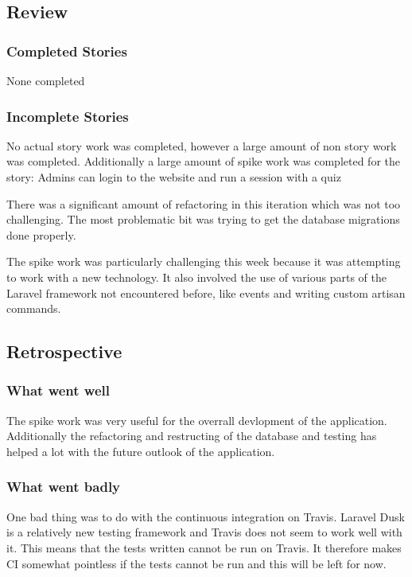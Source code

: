 \subsection{Review}
\subsubsection{Completed Stories}
None completed
\subsubsection{Incomplete Stories}
No actual story work was completed, however a large amount of non story work was completed. Additionally a large amount of spike work was completed for the story: Admins can login to the website and run a session with a quiz

There was a significant amount of refactoring in this iteration which was not too challenging. The most problematic bit was trying to get the database migrations done properly.

The spike work was particularly challenging this week because it was attempting to work with a new technology. It also involved the use of various parts of the Laravel framework not encountered before, like events and writing custom artisan commands.

\subsection{Retrospective}
\subsubsection{What went well}
The spike work was very useful for the overrall devlopment of the application. Additionally the refactoring and restructing of the database and testing has helped a lot with the future outlook of the application.
\subsubsection{What went badly}
One bad thing was to do with the continuous integration on Travis. Laravel Dusk is a relatively new testing framework and Travis does not seem to work well with it. This means that the tests written cannot be run on Travis. It therefore makes CI somewhat pointless if the tests cannot be run and this will be left for now.
\newpage
